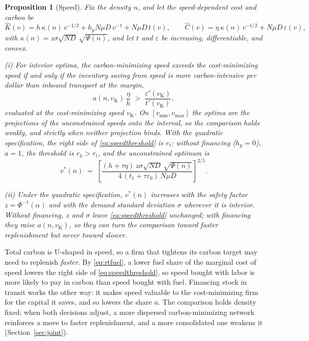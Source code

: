\documentclass[11pt]{article}
\newtheorem{proposition}{Proposition}
\numberwithin{proposition}{section}
\theoremstyle{definition}
\theoremstyle{remark}
\theoremstyle{plain}
\begin{document}
\begin{proposition}[Speed]\label{prop:speed}
Fix the density $n$, and let the speed-dependent cost and carbon be
\[
  \hat K(v)=h\,\kappa(n)\,v^{-1/2}+h_pN\mu D\,v^{-1}+N\mu D\,t(v), \qquad \hat C(v)=\eta\,\kappa(n)\,v^{-1/2}+N\mu D\,\varepsilon(v),
\]
with $\kappa(n)=z\sigma\sqrt{ND}\,\sqrt{\Psi(n)}$, and let $t$ and $\varepsilon$ be increasing, differentiable,
and convex.

\smallskip\noindent\textup{(i)} For interior optima, the carbon-minimizing speed exceeds the cost-minimizing speed
if and only if the inventory saving from speed is more carbon-intensive per dollar than inbound transport
\emph{at the margin},
\begin{equation}\label{eq:speedthreshold}
  a(n,v_{\mathrm K})\,\frac{\eta}{h} \;>\; \frac{\varepsilon'(v_{\mathrm K})}{t'(v_{\mathrm K})},
\end{equation}
evaluated at the cost-minimizing speed $v_{\mathrm K}$. On $[v_{\min},v_{\max}]$ the optima are the projections
of the unconstrained speeds onto the interval, so the comparison holds weakly, and strictly when neither
projection binds. With the quadratic specification, the
right side of \eqref{eq:speedthreshold} is $r_t$; without financing ($h_p=0$), $a=1$, the threshold is
$r_h>r_t$, and the unconstrained optimum is
\begin{equation}\label{eq:vstar}
  v^*(n) \;=\; \left[\frac{(h+\tau\eta)\,z\sigma\sqrt{ND}\,\sqrt{\Psi(n)}}
                       {4\,(t_1+\tau\varepsilon_0)\,N\mu D}\right]^{2/5}.
\end{equation}

\smallskip\noindent\textup{(ii)} Under the quadratic specification, $v^*(n)$ increases with the safety factor
$z=\Phi^{-1}(\alpha)$ and with the demand standard deviation $\sigma$ wherever it is interior. Without financing,
$z$ and $\sigma$ leave \eqref{eq:speedthreshold} unchanged; with financing they raise $a(n,v_{\mathrm K})$, so
they can turn the comparison toward faster replenishment but never toward slower.
\end{proposition}

\noindent Total carbon is U-shaped in speed, so a firm that tightens its carbon target may need to replenish
\emph{faster}. By \eqref{eq:rtfuel}, a lower fuel share of the marginal cost of speed lowers the right side
of \eqref{eq:speedthreshold}, so speed bought with labor is more likely to pay in carbon than speed bought with
fuel. Financing stock in transit works the other way: it makes speed valuable to the cost-minimizing firm for the
capital it saves, and so lowers the share $a$.  The comparison holds density
fixed; when both decisions adjust, a more dispersed carbon-minimizing network reinforces a move to faster
replenishment, and a more consolidated one weakens it (Section~\ref{sec:joint}).
\end{document}
